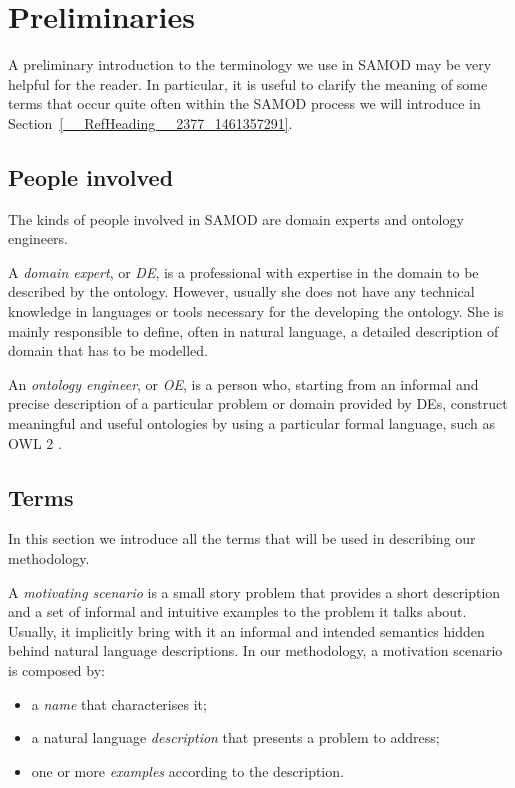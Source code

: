 \documentclass[runningheads,a4paper]{llncs}
\begin{document}
\section{Preliminaries}

A preliminary introduction to the terminology we use in SAMOD may be very helpful for the reader. In particular, it is useful to clarify the meaning of some terms that occur quite often within the SAMOD process we will introduce in Section~\ref{__RefHeading__2377_1461357291}.

\subsection{People involved}

The kinds of people involved in SAMOD are domain experts and ontology engineers.

A {\em domain expert}, or {\em DE}, is a professional with expertise in the domain to be described by the ontology. However, usually she does not have any technical knowledge in languages or tools necessary for the developing the ontology. She is mainly responsible to define, often in natural language, a detailed description of domain that has to be modelled.

An {\em ontology engineer}, or {\em OE}, is a person who, starting from an informal and precise description of a particular problem or domain provided by DEs, construct meaningful and useful ontologies by using a particular formal language, such as OWL 2  \cite{__RefNumPara__3275_1461357291}.

\subsection{Terms}

In this section we introduce all the terms that will be used in describing our methodology.

A {\em motivating scenario} \cite{__RefNumPara__2389_1461357291} is a small story problem that provides a short description and a set of informal and intuitive examples to the problem it talks about. Usually, it implicitly bring with it an informal and intended semantics hidden behind natural language descriptions. In our methodology, a motivation scenario is composed by:
\begin{itemize}
\item a {\em name} that characterises it;
\item a natural language {\em description} that presents a problem to address;
\item one or more {\em examples} according to the description.
\end{itemize}
\end{document}
